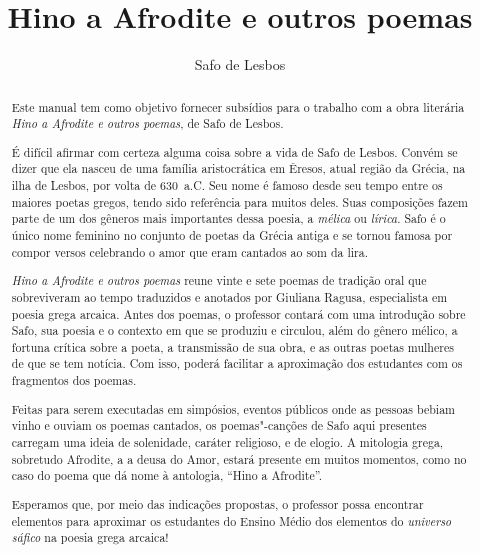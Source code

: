 \documentclass[12pt]{extarticle}
\begin{document}
\newcommand{\AutorLivro}{Safo de Lesbos}
\newcommand{\TituloLivro}{Hino a Afrodite e outros poemas}
\newcommand{\Tema}{Ficção, mistério e fantasia}
\newcommand{\Genero}{Poema}
\newcommand{\imagemCapa}{./images/PNLD0035-01.png}
\newcommand{\issnppub}{---}
\newcommand{\issnepub}{---}
\newcommand{\colaborador}{{Vicente Castro e Bruno Gradella}}


\title{\TituloLivro}
\author{\AutorLivro}
\def\authornotes{\colaborador}

\date{}
\maketitle

\baselineskip\par


\begin{abstract}
Este manual tem como objetivo fornecer subsídios para o trabalho com a
obra literária \emph{Hino a Afrodite e outros poemas}, de Safo de Lesbos.

É difícil afirmar com certeza alguma coisa sobre a vida de Safo de Lesbos.
Convém se dizer que ela nasceu de uma família aristocrática em Êresos, atual região da
Grécia, na ilha de Lesbos, por volta de 630~a.C. Seu nome é famoso desde seu tempo entre 
os maiores poetas gregos, tendo sido referência para muitos deles. Suas composições fazem
parte de um dos gêneros mais importantes dessa poesia, a \textit{mélica} ou \textit{lírica}.
Safo é o único nome feminino no conjunto de poetas da Grécia antiga e se tornou famosa por 
compor versos celebrando o amor que eram cantados ao som da lira.

\emph{Hino a Afrodite e outros poemas} reune vinte e sete poemas de tradição oral
que sobreviveram ao tempo traduzidos e anotados por Giuliana Ragusa, especialista em 
poesia grega arcaica. Antes dos poemas, o professor contará com uma introdução sobre Safo, 
sua poesia e o contexto em que se produziu e circulou, além do gênero mélico, a fortuna 
crítica sobre a poeta, a transmissão de sua obra, e as outras poetas mulheres de que se 
tem notícia. Com isso, poderá facilitar a aproximação dos estudantes com os fragmentos 
dos poemas.

Feitas para serem executadas em simpósios, eventos públicos onde as pessoas bebiam vinho
e ouviam os poemas cantados, os poemas"-canções de Safo aqui presentes carregam uma ideia 
de solenidade, caráter religioso, e de elogio. A mitologia grega, sobretudo Afrodite, a 
a deusa do Amor, estará presente em muitos momentos, como no caso do poema que dá nome 
à antologia, ``Hino a Afrodite''. 

Esperamos que, por meio das indicações propostas, o professor possa encontrar elementos 
para aproximar os estudantes do Ensino Médio dos elementos do 
\emph{universo sáfico} na poesia grega arcaica!

\end{abstract}
\end{document}
